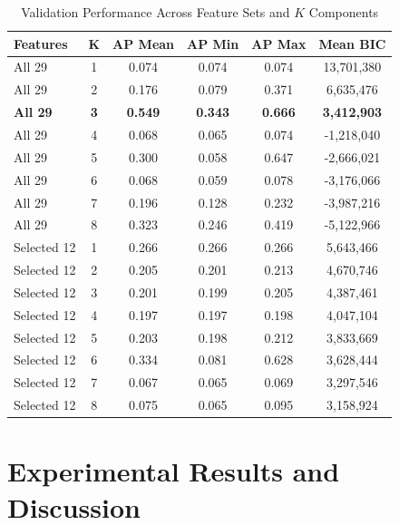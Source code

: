 \documentclass[10pt,journal,compsoc]{IEEEtran}
\begin{document}
\begin{table}[t]
\centering
\caption{Validation Performance Across Feature Sets and $K$ Components}
\label{tab:gmm_results}
\begin{tabular}{lccccc}
\toprule
\textbf{Features} & $\mathbf{K}$ & \textbf{AP Mean} & \textbf{AP Min} & \textbf{AP Max} & \textbf{Mean BIC} \\
\midrule
All 29 & 1 & 0.074 & 0.074 & 0.074 & 13,701,380 \\
All 29 & 2 & 0.176 & 0.079 & 0.371 & 6,635,476 \\
\textbf{All 29} & \textbf{3} & \textbf{0.549} & \textbf{0.343} & \textbf{0.666} & \textbf{3,412,903} \\
All 29 & 4 & 0.068 & 0.065 & 0.074 & -1,218,040 \\
All 29 & 5 & 0.300 & 0.058 & 0.647 & -2,666,021 \\
All 29 & 6 & 0.068 & 0.059 & 0.078 & -3,176,066 \\
All 29 & 7 & 0.196 & 0.128 & 0.232 & -3,987,216 \\
All 29 & 8 & 0.323 & 0.246 & 0.419 & -5,122,966 \\
\midrule
Selected 12 & 1 & 0.266 & 0.266 & 0.266 & 5,643,466 \\
Selected 12 & 2 & 0.205 & 0.201 & 0.213 & 4,670,746 \\
Selected 12 & 3 & 0.201 & 0.199 & 0.205 & 4,387,461 \\
Selected 12 & 4 & 0.197 & 0.197 & 0.198 & 4,047,104 \\
Selected 12 & 5 & 0.203 & 0.198 & 0.212 & 3,833,669 \\
Selected 12 & 6 & 0.334 & 0.081 & 0.628 & 3,628,444 \\
Selected 12 & 7 & 0.067 & 0.065 & 0.069 & 3,297,546 \\
Selected 12 & 8 & 0.075 & 0.065 & 0.095 & 3,158,924 \\
\bottomrule
\end{tabular}
\end{table}

\section{Experimental Results and Discussion}
\end{document}
